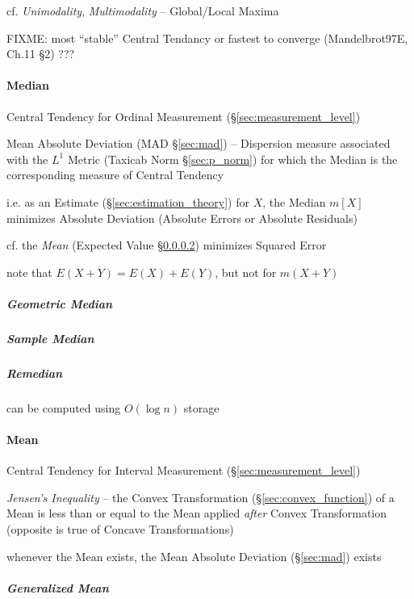 cf. \emph{Unimodality}, \emph{Multimodality} -- Global/Local Maxima

FIXME: most ``stable'' Central Tendancy or fastest to converge (Mandelbrot97E,
Ch.11 \S 2) ???



\paragraph{Median}\label{sec:median}\hfill

Central Tendency for Ordinal Measurement (\S\ref{sec:measurement_level})

\fist Mean Absolute Deviation (MAD \S\ref{sec:mad}) -- Dispersion measure
associated with the $L^1$ Metric (Taxicab Norm \S\ref{sec:p_norm}) for which the
Median is the corresponding measure of Central Tendency

i.e. as an Estimate (\S\ref{sec:estimation_theory}) for $X$, the Median $m[X]$
minimizes Absolute Deviation (Absolute Errors or Absolute Residuals)

cf. the \emph{Mean} (Expected Value \S\ref{sec:mean}) minimizes Squared Error

note that $E(X + Y) = E(X) + E(Y)$, but not for $m(X+Y)$



\subparagraph{Geometric Median}\label{sec:geometric_median}\hfill

\subparagraph{Sample Median}\label{sec:sample_median}\hfill

\subparagraph{Remedian}\label{sec:remedian}\hfill

can be computed using $O(\log n)$ storage



\paragraph{Mean}\label{sec:mean}\hfill

Central Tendency for Interval Measurement (\S\ref{sec:measurement_level})

\emph{Jensen's Inequality} -- the Convex Transformation
(\S\ref{sec:convex_function}) of a Mean is less than or equal to the Mean
applied \emph{after} Convex Transformation (opposite is true of Concave
Transformations)

whenever the Mean exists, the Mean Absolute Deviation (\S\ref{sec:mad}) exists



\subparagraph{Generalized Mean}\label{sec:generalized_mean}\hfill

